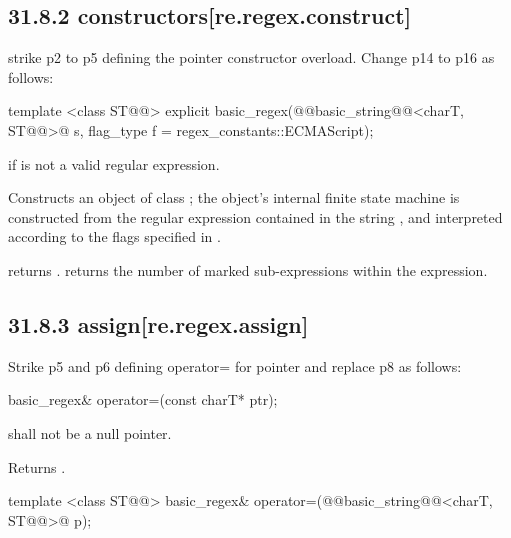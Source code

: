 \documentclass[ebook,11pt,article]{memoir}
\begin{document}
\subsection{31.8.2  constructors[re.regex.construct]}

strike p2 to p5 defining the  pointer constructor overload. 
Change p14 to p16 as follows:

\begin{itemdecl}
template <class ST@@>
  explicit basic_regex(@@basic_string@@<charT, ST@@>@\removed{\&} s,
                       flag_type f = regex_constants::ECMAScript);
\end{itemdecl}

\begin{itemdescr}
\pnum
\throws  {} if  is not a valid regular expression. 

\pnum
\effects  Constructs an object of class ; the object's
internal finite state machine is constructed from the regular
expression contained in the string  , and interpreted according to the
flags specified in .

\pnum\postconditions
{} returns .  
 returns the number of marked sub-expressions
within the expression.
\end{itemdescr}

\subsection{31.8.3  assign[re.regex.assign]}
Strike p5 and p6 defining operator= for  pointer and replace p8 as follows:
\begin{removedblock}
\begin{itemdecl}
basic_regex& operator=(const charT* ptr); 
\end{itemdecl}

\begin{itemdescr}
\pnum
\requires  {} shall not be a null pointer. 

\pnum
\effects Returns .
\end{itemdescr}
\end{removedblock}

\begin{itemdecl}
template <class ST@@>
  basic_regex& operator=(@@basic_string@@<charT, ST@@>@\removed{\&} p); 
\end{itemdecl}
\end{document}
